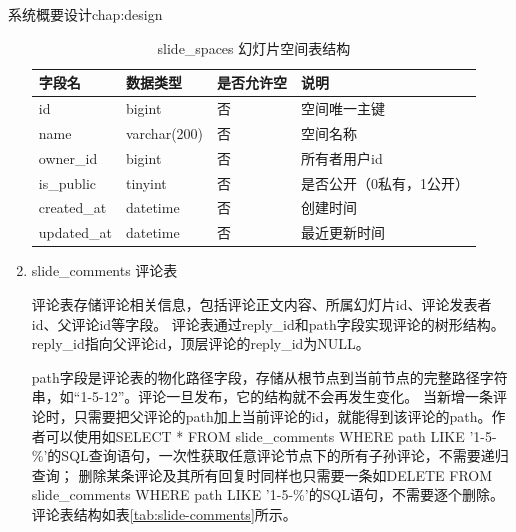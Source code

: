\begin{cuzchapter}{系统概要设计}{chap:design}
\begin{enumerate}
    \begin{table}[htbp]
        \centering
        \caption{slide\_spaces 幻灯片空间表结构}
        \label{tab:slide-spaces}
        \begin{tabular}{llll}
            \toprule
            字段名         & 数据类型         & 是否允许空 & 说明            \\
            \midrule
            id          & bigint       & 否     & 空间唯一主键        \\
            name        & varchar(200) & 否     & 空间名称          \\
            owner\_id   & bigint       & 否     & 所有者用户id       \\
            is\_public  & tinyint      & 否     & 是否公开（0私有，1公开） \\
            created\_at & datetime     & 否     & 创建时间          \\
            updated\_at & datetime     & 否     & 最近更新时间        \\
            \bottomrule
        \end{tabular}
    \end{table}
   \item slide\_comments 评论表
   
    评论表存储评论相关信息，包括评论正文内容、所属幻灯片id、评论发表者id、父评论id等字段。
    评论表通过reply\_id和path字段实现评论的树形结构。
    reply\_id指向父评论id，顶层评论的reply\_id为NULL。

    path字段是评论表的物化路径字段，存储从根节点到当前节点的完整路径字符串，如“1-5-12”。评论一旦发布，它的结构就不会再发生变化。
    当新增一条评论时，只需要把父评论的path加上当前评论的id，就能得到该评论的path。作者可以使用如SELECT * FROM slide\_comments WHERE path LIKE '1-5-\%'的SQL查询语句，一次性获取任意评论节点下的所有子孙评论，不需要递归查询；
    删除某条评论及其所有回复时同样也只需要一条如DELETE FROM slide\_comments WHERE path LIKE '1-5-\%'的SQL语句，不需要逐个删除。
    评论表结构如表\ref{tab:slide-comments}所示。



\end{enumerate}
\end{cuzchapter}
